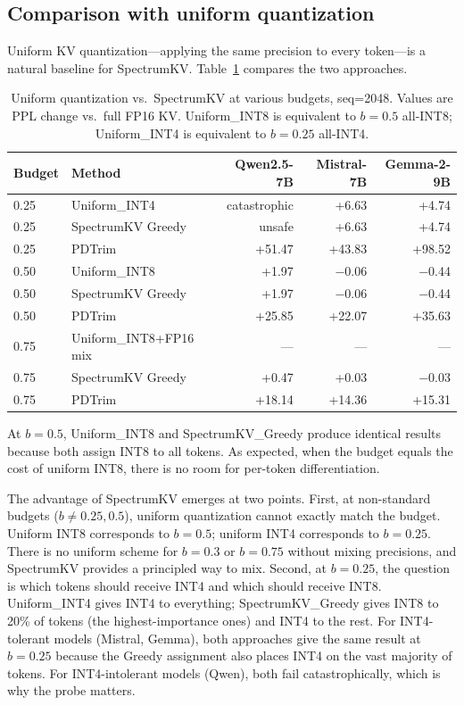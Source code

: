 \documentclass[11pt]{article}
\newcommand{\method}{SpectrumKV}
\newcommand{\budget}{b}
\newcommand{\pct}{\%}
\theoremstyle{plain}
\theoremstyle{definition}
\begin{document}
\subsection{Comparison with uniform quantization}
\label{sec:uniform-comparison}

Uniform KV quantization---applying the same precision to every token---is a natural baseline for \method{}.  Table~\ref{tab:uniform} compares the two approaches.

\begin{table}[t]
\centering
\caption{Uniform quantization vs.\ \method{} at various budgets, seq=2048.  Values are PPL change vs.\ full FP16 KV.  Uniform\_INT8 is equivalent to $\budget=0.5$ all-INT8; Uniform\_INT4 is equivalent to $\budget=0.25$ all-INT4.}
\label{tab:uniform}
\small
\begin{tabular}{llrrr}
\toprule
Budget & Method & Qwen2.5-7B & Mistral-7B & Gemma-2-9B \\
\midrule
0.25 & Uniform\_INT4 & catastrophic & +6.63 & +4.74 \\
0.25 & \method{} Greedy & unsafe & +6.63 & +4.74 \\
0.25 & PDTrim & +51.47 & +43.83 & +98.52 \\
\midrule
0.50 & Uniform\_INT8 & +1.97 & $-$0.06 & $-$0.44 \\
0.50 & \method{} Greedy & +1.97 & $-$0.06 & $-$0.44 \\
0.50 & PDTrim & +25.85 & +22.07 & +35.63 \\
\midrule
0.75 & Uniform\_INT8+FP16 mix & --- & --- & --- \\
0.75 & \method{} Greedy & +0.47 & +0.03 & $-$0.03 \\
0.75 & PDTrim & +18.14 & +14.36 & +15.31 \\
\bottomrule
\end{tabular}
\end{table}

At $\budget=0.5$, Uniform\_INT8 and \method{}\_Greedy produce identical results because both assign INT8 to all tokens.  As expected, when the budget equals the cost of uniform INT8, there is no room for per-token differentiation.

The advantage of \method{} emerges at two points.  First, at non-standard budgets ($\budget \ne 0.25, 0.5$), uniform quantization cannot exactly match the budget.  Uniform INT8 corresponds to $\budget=0.5$; uniform INT4 corresponds to $\budget=0.25$.  There is no uniform scheme for $\budget=0.3$ or $\budget=0.75$ without mixing precisions, and \method{} provides a principled way to mix.  Second, at $\budget=0.25$, the question is which tokens should receive INT4 and which should receive INT8.  Uniform\_INT4 gives INT4 to everything; \method{}\_Greedy gives INT8 to 20\pct{} of tokens (the highest-importance ones) and INT4 to the rest.  For INT4-tolerant models (Mistral, Gemma), both approaches give the same result at $\budget=0.25$ because the Greedy assignment also places INT4 on the vast majority of tokens.  For INT4-intolerant models (Qwen), both fail catastrophically, which is why the probe matters.
\end{document}
